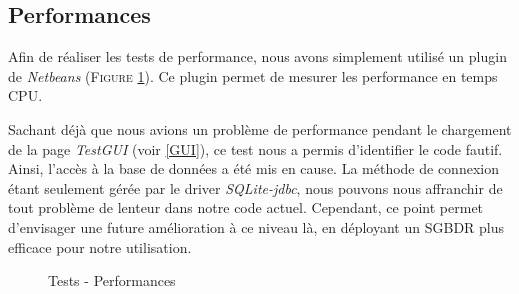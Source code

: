 \subsection{Performances}

Afin de réaliser les tests de performance, nous avons simplement utilisé un plugin de \textit{Netbeans} (\textsc{Figure} \ref{perf}). Ce plugin permet de mesurer les performance en temps CPU.

Sachant déjà que nous avions un problème de performance pendant le chargement de la page \textit{TestGUI} (voir \ref{GUI}), ce test nous a permis d'identifier le code fautif.
Ainsi, l'accès à la base de données a été mis en cause. La méthode de connexion étant seulement gérée par le driver \textit{SQLite-jdbc}, nous pouvons nous affranchir de tout problème de lenteur dans notre code actuel. Cependant, ce point permet d'envisager une future amélioration à ce niveau là, en déployant un SGBDR plus efficace pour notre utilisation.

\begin{figure}[!ht]
\begin{center}
  \caption{Tests - Performances}
  \label{perf} 
\end{center}
\end{figure}






